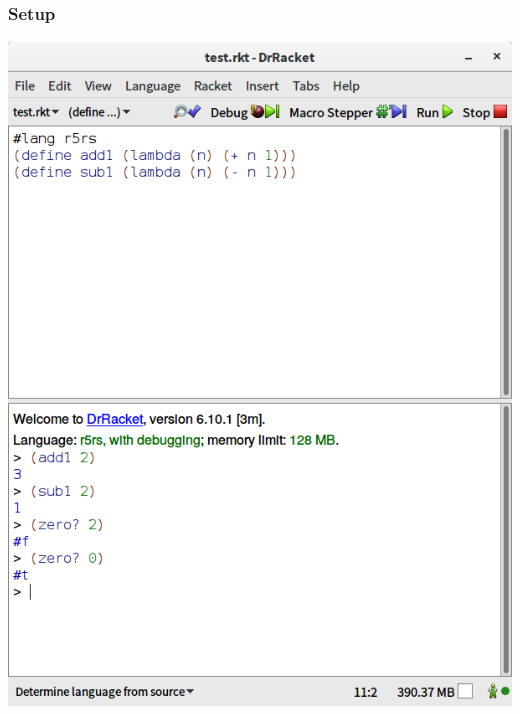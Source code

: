 \documentclass[xcolor=pdftex,dvipsnames,table]{beamer}
\begin{document}
\begin{frame}
  \frametitle{Setup}
  \begin{center}
    \includegraphics[height=0.8\textheight]{screenshot}
  \end{center}
\end{frame}


\end{document}

